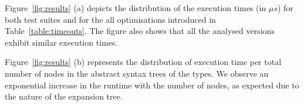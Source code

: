 %
Figure~\ref{fig:results} (a) depicts the distribution of the execution
times (in $\mu s$) for both test suites and for the all optimisations
introduced in Table~\ref{table:timeouts}. The figure also shows that all the 
analysed versions exhibit similar execution times.



Figure~\ref{fig:results} (b) represents the distribution of execution
time per total number of nodes in the abstract syntax trees of the
types. We observe an exponential increase in the
runtime with the number of nodes, as expected due to the nature of the
expansion tree.




